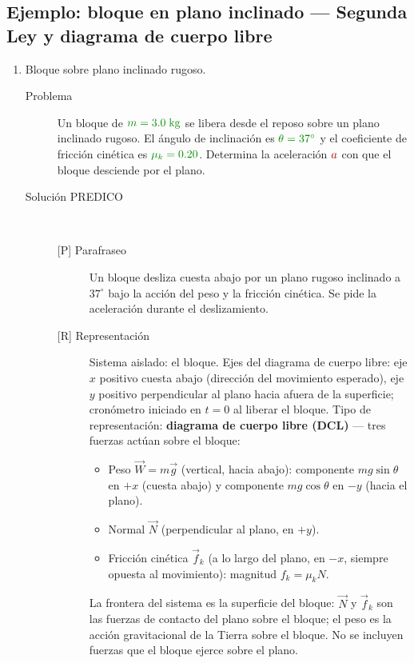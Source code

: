 \documentclass[11pt]{book}
\newcommand{\dato}[1]{\textcolor{colDatos}{#1}}
\newcommand{\incog}[1]{\textcolor{colIncog}{#1}}
\begin{document}
\bigskip
\subsection*{Ejemplo: bloque en plano inclinado --- Segunda Ley y diagrama de cuerpo libre}
\label{ex:planoinclinado}

\begin{enumerate}
\item Bloque sobre plano inclinado rugoso.
\begin{description}

\item[Problema] Un bloque de $\dato{m = 3.0\;\text{kg}}$ se libera desde el reposo sobre un plano inclinado rugoso. El ángulo de inclinación es $\dato{\theta = 37^\circ}$ y el coeficiente de fricción cinética es $\dato{\mu_k = 0.20}$. Determina la aceleración $\incog{a}$ con que el bloque desciende por el plano.

\item[Solución PREDICO]~

\begin{description}
    \item[{[P]} Parafraseo] Un bloque desliza cuesta abajo por un plano rugoso inclinado a $37^\circ$ bajo la acción del peso y la fricción cinética. Se pide la aceleración durante el deslizamiento.

    \item[{[R]} Representación] Sistema aislado: el bloque. Ejes del diagrama de cuerpo libre: eje $x$ positivo cuesta abajo (dirección del movimiento esperado), eje $y$ positivo perpendicular al plano hacia afuera de la superficie; cronómetro iniciado en $t = 0$ al liberar el bloque. Tipo de representación: {\bf diagrama de cuerpo libre (DCL)} — tres fuerzas actúan sobre el bloque:
    \begin{itemize}
        \item Peso $\vec{W} = m\vec{g}$ (vertical, hacia abajo): componente $mg\sin\theta$ en $+x$ (cuesta abajo) y componente $mg\cos\theta$ en $-y$ (hacia el plano).
        \item Normal $\vec{N}$ (perpendicular al plano, en $+y$).
        \item Fricción cinética $\vec{f}_k$ (a lo largo del plano, en $-x$, siempre opuesta al movimiento): magnitud $f_k = \mu_k N$.
    \end{itemize}
    La frontera del sistema es la superficie del bloque: $\vec{N}$ y $\vec{f}_k$ son las fuerzas de contacto del plano sobre el bloque; el peso es la acción gravitacional de la Tierra sobre el bloque. No se incluyen fuerzas que el bloque ejerce sobre el plano.


\end{description}
\end{description}
\end{enumerate}
\end{document}
